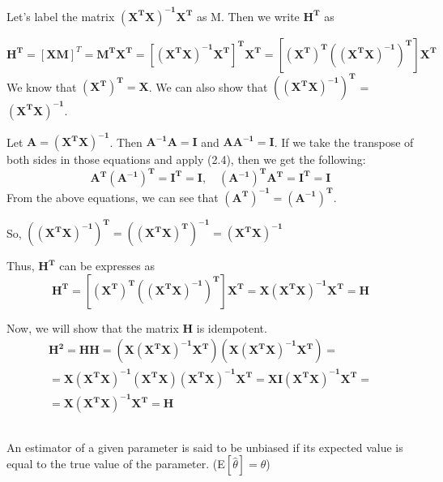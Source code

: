 \documentclass{homework}
\begin{document}
    Let's label the matrix $\mathbf{(X^TX)^{-1}X^T}$ as M. Then we write $\mathbf{H^{T}}$ as
    
    \begin{equation*}
        \mathbf{H^{T}} = \left[\mathbf{XM}\right]^T = \mathbf{M^TX^T} = 
        \mathbf{\left[(X^TX)^{-1}X^T\right]^TX^T} = \mathbf{\left[(X^T)^T\left((X^TX)^{-1}\right)^T\right]X^T}
    \end{equation*}
    We know that $\mathbf{(X^T)^T} = \mathbf{X}$. We can also show that $\mathbf{\left((X^TX)^{-1}\right)^T}$ = $\mathbf{(X^TX)^{-1}}$.
    
    Let $\mathbf{A} = \mathbf{(X^TX)^{-1}}$. Then $\mathbf{A^{-1}A} = \mathbf{I}$ and $\mathbf{AA^{-1}} = \mathbf{I}$. If we take the transpose of both sides in those equations and apply (2.4), then we get the following:
    \[  \mathbf{A^T(A^{-1})^T} = \mathbf{I^T} = \mathbf{I}, \quad \mathbf{(A^{-1})^TA^T} = \mathbf{I^T} = \mathbf{I} \]
    From the above equations, we can see that $\mathbf{(A^T)^{-1}} = \mathbf{(A^{-1})^T}$.
    
    So, $\mathbf{\left((X^TX)^{-1}\right)^T} = \mathbf{\left((X^TX)^T\right)^{-1}} = \mathbf{(X^TX)^{-1}}$
    
    Thus, $\mathbf{H^T}$ can be expresses as
    \begin{equation*}
        \mathbf{H^T} = \mathbf{\left[(X^T)^T\left((X^TX)^{-1}\right)^T\right]X^T} =
         \mathbf{X(X^TX)^{-1}X^T} = \mathbf{H}
    \end{equation*}
    
    Now, we will show that the matrix $\mathbf{H}$ is idempotent.
    \begin{equation*}
    \begin{gathered}
        \mathbf{H^2} = \mathbf{HH} = \mathbf{\left(X(X^TX)^{-1}X^T\right)\left(X(X^TX)^{-1}X^T\right)} = \\
        = \mathbf{X(X^TX)^{-1}(X^TX)(X^TX)^{-1}X^T} = \mathbf{XI(X^TX)^{-1}X^T} = \\
        = \mathbf{X(X^TX)^{-1}X^T} = \mathbf{H}
    \end{gathered}
    \end{equation*}
    \vspace{5mm}
    
    \subsection{}
        An estimator of a given parameter is said to be unbiased if its expected value is equal to the true value of the parameter. (E$[\hat{\theta}] = \theta$)
        \vspace{2mm}
        
\end{document}
